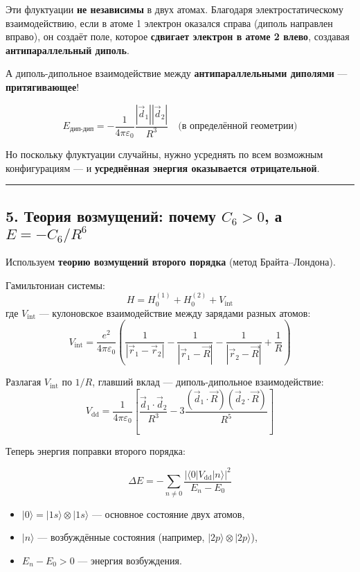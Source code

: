 \documentclass[11pt]{article}
\providecommand{\tightlist}{%
      \setlength{\itemsep}{0pt}\setlength{\parskip}{0pt}}
\begin{document}
Эти флуктуации \textbf{не независимы} в двух атомах. Благодаря
электростатическому взаимодействию, если в атоме 1 электрон оказался
справа (диполь направлен вправо), он создаёт поле, которое
\textbf{сдвигает электрон в атоме 2 влево}, создавая
\textbf{антипараллельный диполь}.

А диполь-дипольное взаимодействие между \textbf{антипараллельными
диполями} --- \textbf{притягивающее}!

\[
E_{\text{дип-дип}} = -\frac{1}{4\pi\varepsilon_0} \frac{|\vec{d}_1||\vec{d}_2|}{R^3} \quad \text{(в определённой геометрии)}
\]

Но поскольку флуктуации случайны, нужно усреднять по всем возможным
конфигурациям --- и \textbf{усреднённая энергия оказывается
отрицательной}.

\begin{center}\rule{0.5\linewidth}{\linethickness}\end{center}

\subsection{\texorpdfstring{5. Теория возмущений: почему \(C_6 > 0\), а
\(E = -C_6/R^6\)}{5. Теория возмущений: почему C\_6 \textgreater{} 0, а E = -C\_6/R\^{}6}}\label{ux442ux435ux43eux440ux438ux44f-ux432ux43eux437ux43cux443ux449ux435ux43dux438ux439-ux43fux43eux447ux435ux43cux443-c_6-0-ux430-e--c_6r6}

Используем \textbf{теорию возмущений второго порядка} (метод
Брайта--Лондона).

Гамильтониан системы: \[
H = H_0^{(1)} + H_0^{(2)} + V_{\text{int}}
\] где \(V_{\text{int}}\) --- кулоновское взаимодействие между зарядами
разных атомов: \[
V_{\text{int}} = \frac{e^2}{4\pi\varepsilon_0} \left( \frac{1}{|\vec{r}_1 - \vec{r}_2|} - \frac{1}{|\vec{r}_1 - \vec{R}|} - \frac{1}{|\vec{r}_2 - \vec{R}|} + \frac{1}{R} \right)
\]

Разлагая \(V_{\text{int}}\) по \(1/R\), главший вклад ---
диполь-дипольное взаимодействие: \[
V_{\text{dd}} = \frac{1}{4\pi\varepsilon_0} \left[ \frac{\vec{d}_1 \cdot \vec{d}_2}{R^3} - 3 \frac{(\vec{d}_1 \cdot \vec{R})(\vec{d}_2 \cdot \vec{R})}{R^5} \right]
\]

Теперь энергия поправки второго порядка:

\[
\Delta E = - \sum_{n \neq 0} \frac{ |\langle 0 | V_{\text{dd}} | n \rangle|^2 }{E_n - E_0}
\]

\begin{itemize}
\tightlist
\item
  \(|0\rangle = |1s\rangle \otimes |1s\rangle\) --- основное состояние
  двух атомов,
\item
  \(|n\rangle\) --- возбуждённые состояния (например,
  \(|2p\rangle \otimes |2p\rangle\)),
\item
  \(E_n - E_0 > 0\) --- энергия возбуждения.
\end{itemize}
\end{document}
